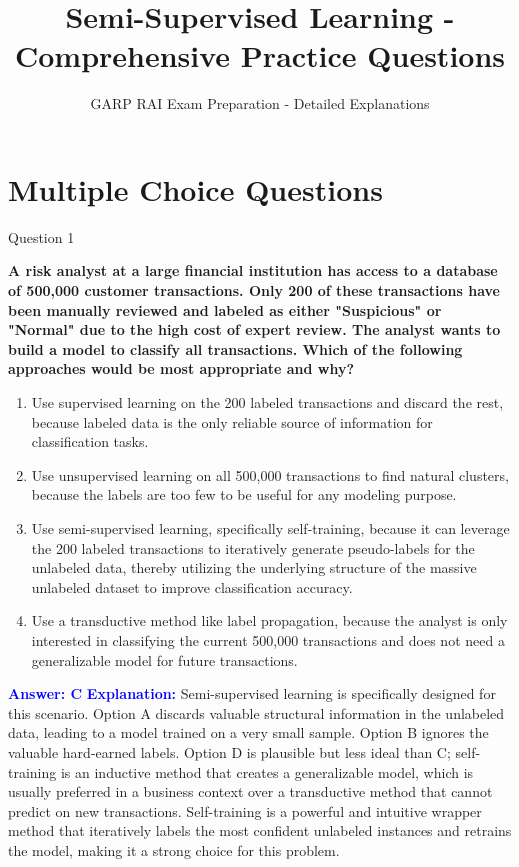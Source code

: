 \documentclass{beamer}
\title{Semi-Supervised Learning - Comprehensive Practice Questions}
\subtitle{GARP RAI Exam Preparation - Detailed Explanations}
\author{}
\date{}
\begin{document}
	
	\begin{frame}
		\titlepage
	\end{frame}
	
	\section{Multiple Choice Questions}
	
	\begin{frame}{Question 1}
		
		\textbf{A risk analyst at a large financial institution has access to a database of 500,000 customer transactions. Only 200 of these transactions have been manually reviewed and labeled as either "Suspicious" or "Normal" due to the high cost of expert review. The analyst wants to build a model to classify all transactions. Which of the following approaches would be most appropriate and why?}
		\begin{enumerate}
			\item Use supervised learning on the 200 labeled transactions and discard the rest, because labeled data is the only reliable source of information for classification tasks.
			\item Use unsupervised learning on all 500,000 transactions to find natural clusters, because the labels are too few to be useful for any modeling purpose.
			\item Use semi-supervised learning, specifically self-training, because it can leverage the 200 labeled transactions to iteratively generate pseudo-labels for the unlabeled data, thereby utilizing the underlying structure of the massive unlabeled dataset to improve classification accuracy.
			\item Use a transductive method like label propagation, because the analyst is only interested in classifying the current 500,000 transactions and does not need a generalizable model for future transactions.
		\end{enumerate}
		\vspace{0.2cm}
		\textcolor{blue}{\textbf{Answer: C}}
		\vspace{0.2cm}
		\textcolor{blue}{\textbf{Explanation:}} Semi-supervised learning is specifically designed for this scenario. Option A discards valuable structural information in the unlabeled data, leading to a model trained on a very small sample. Option B ignores the valuable hard-earned labels. Option D is plausible but less ideal than C; self-training is an inductive method that creates a generalizable model, which is usually preferred in a business context over a transductive method that cannot predict on new transactions. Self-training is a powerful and intuitive wrapper method that iteratively labels the most confident unlabeled instances and retrains the model, making it a strong choice for this problem.
	\end{frame}
	
\end{document}
